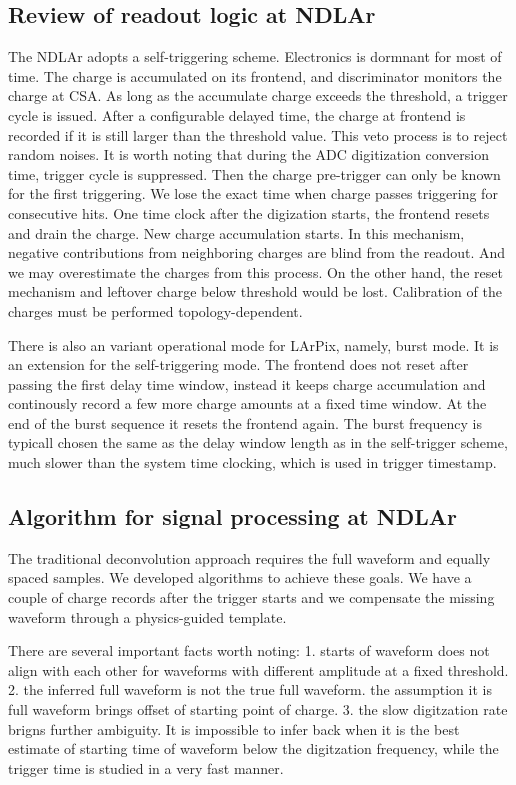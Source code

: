 \documentclass[a4paper,11pt]{article}
\begin{document}
\subsection{Review of readout logic at NDLAr}
The NDLAr adopts a self-triggering scheme. Electronics is dormnant for most of time. The charge is accumulated on its frontend, and discriminator monitors the charge at CSA.
As long as the accumulate charge exceeds the threshold, a trigger cycle is issued. After a configurable delayed time, the charge at frontend is recorded if it is still larger than the threshold value. This veto process is to reject random noises. It is worth noting that during the ADC digitization conversion time, trigger cycle is suppressed. Then the charge pre-trigger can only be known for the first triggering. We lose the exact time when charge passes triggering for consecutive hits. One time clock after the digization starts, the frontend resets and drain the charge. New charge accumulation starts. In this mechanism, negative contributions from neighboring charges are blind from the readout. And we may overestimate the charges from this process. On the other hand, the reset mechanism and leftover charge below threshold would be lost. Calibration of the charges must be performed topology-dependent.

There is also an variant operational mode for LArPix, namely, burst mode. It is an extension for the self-triggering mode. The frontend does not reset after passing the first delay time window, instead it keeps charge accumulation and continously record a few more charge amounts at a fixed time window. At the end of the burst sequence it resets the frontend again. The burst frequency is typicall chosen the same as the delay window length as in the self-trigger scheme, much slower than the system time clocking, which is used in trigger timestamp.

\subsection{Algorithm for signal processing at NDLAr}
The traditional deconvolution approach requires the full waveform and equally spaced samples. We developed algorithms to achieve these goals. We have a couple of charge records after the trigger starts and we compensate the missing waveform through a physics-guided template.

There are several important facts worth noting:
1. starts of waveform does not align with each other for waveforms with different amplitude at a fixed threshold. 2. the inferred full waveform is not the true full waveform. the assumption it is full waveform brings offset of starting point of charge. 3. the slow digitzation rate brigns further ambiguity. It is impossible to infer back when it is the best estimate of starting time of waveform below the digitzation frequency, while the trigger time is studied in a very fast manner.
\end{document}
